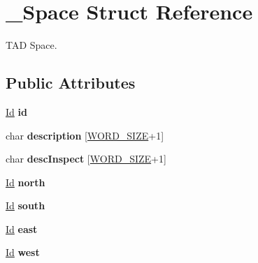 \hypertarget{struct___space}{\section{\-\_\-\-Space Struct Reference}
\label{struct___space}
}


T\-A\-D Space.  


\subsection*{Public Attributes}
\begin{DoxyCompactItemize}
\item 
\hypertarget{struct___space_a70cb461deb9ac073e401b607339b567f}{\hyperlink{_types_8h_a845e604fb28f7e3d97549da3448149d3}{Id} {\bfseries id}}\label{struct___space_a70cb461deb9ac073e401b607339b567f}

\item 
\hypertarget{struct___space_a41a1dbfab1d88b732db50d7335c2f328}{char {\bfseries description} \mbox{[}\hyperlink{_types_8h_a92ed8507d1cd2331ad09275c5c4c1c89}{W\-O\-R\-D\-\_\-\-S\-I\-Z\-E}+1\mbox{]}}\label{struct___space_a41a1dbfab1d88b732db50d7335c2f328}

\item 
\hypertarget{struct___space_a0f37b32d43a15dd3a6f4431ec5a96129}{char {\bfseries desc\-Inspect} \mbox{[}\hyperlink{_types_8h_a92ed8507d1cd2331ad09275c5c4c1c89}{W\-O\-R\-D\-\_\-\-S\-I\-Z\-E}+1\mbox{]}}\label{struct___space_a0f37b32d43a15dd3a6f4431ec5a96129}

\item 
\hypertarget{struct___space_ae5ebe53ce79514d7d2d93911e0159252}{\hyperlink{_types_8h_a845e604fb28f7e3d97549da3448149d3}{Id} {\bfseries north}}\label{struct___space_ae5ebe53ce79514d7d2d93911e0159252}

\item 
\hypertarget{struct___space_a646b68c22a0bbf1685033c96109d31d1}{\hyperlink{_types_8h_a845e604fb28f7e3d97549da3448149d3}{Id} {\bfseries south}}\label{struct___space_a646b68c22a0bbf1685033c96109d31d1}

\item 
\hypertarget{struct___space_a41ce2bf33cf0c157b358221f094ee05b}{\hyperlink{_types_8h_a845e604fb28f7e3d97549da3448149d3}{Id} {\bfseries east}}\label{struct___space_a41ce2bf33cf0c157b358221f094ee05b}

\item 
\hypertarget{struct___space_a20c1d259e93b44e24ba82982e142eb9b}{\hyperlink{_types_8h_a845e604fb28f7e3d97549da3448149d3}{Id} {\bfseries west}}\label{struct___space_a20c1d259e93b44e24ba82982e142eb9b}


\end{DoxyCompactItemize}
